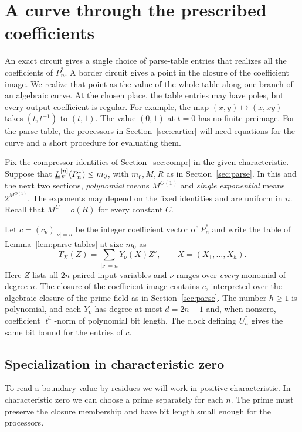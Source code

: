 \section{A curve through the prescribed coefficients}\label{sec:descent}

An exact circuit gives a single choice of parse-table entries that realizes
all the coefficients of $P_n^*$. A border circuit gives a point in the
closure of the coefficient image. We realize that point as the value of the
whole table along one branch of an algebraic curve. At the chosen place,
the table entries may have poles, but every output coefficient is regular.
For example, the map $(x,y)\mapsto(x,xy)$ takes $(t,t^{-1})$ to
$(t,1)$. The value $(0,1)$ at $t=0$ has no finite preimage.
For the parse table, the processors in Section~\ref{sec:cartier} will
need equations for the curve and a short procedure for evaluating them.

Fix the compressor identities of Section~\ref{sec:compr} in the given
characteristic. Suppose that $\underline L_F^{[n]}(P_n^*)\le m_0$, with $m_0,M,R$
as in Section~\ref{sec:parse}. In this and the next two sections,
\emph{polynomial} means $M^{O(1)}$ and \emph{single exponential} means
$2^{M^{O(1)}}$. The exponents may depend on the fixed identities and are
uniform in $n$. Recall that $M^C=o(R)$ for every constant $C$.

Let $c=(c_\nu)_{|\nu|=n}$ be the integer coefficient vector of $P_n^*$
and write the table of Lemma~\ref{lem:parse-tables} at size $m_0$ as
\[
 T_X(Z)=\sum_{|\nu|=n}Y_\nu(X)Z^\nu,\qquad X=(X_1,\ldots,X_h).
\]
Here $Z$ lists all $2n$ paired input variables and $\nu$ ranges over
\emph{every} monomial of degree $n$. The closure of the coefficient
image contains $c$, interpreted over the algebraic closure of the prime
field as in Section~\ref{sec:parse}. The number $h\ge1$ is polynomial,
and each $Y_\nu$ has degree at most $d=2n-1$ and, when nonzero,
coefficient $\ell^1$-norm of polynomial bit length. The clock defining
$U_n^*$ gives the same bit bound for the entries of $c$.

\subsection{Specialization in characteristic zero}

To read a boundary value by residues we will work in positive
characteristic. In characteristic zero we can choose a prime separately
for each $n$. The prime must preserve the closure membership and have
bit length small enough for the processors.


